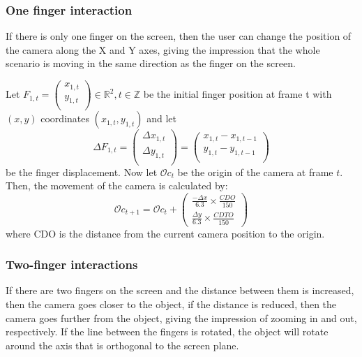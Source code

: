 \documentclass[12pt]{extarticle}
\newcommand{\R}{\mathbb{R}}
\newcommand{\Z}{\mathbb{Z}}
\begin{document}
\subsubsection* {One finger interaction}
If there is only one finger on the screen, then the user can change the position of the camera along the X and Y axes, giving the impression that the whole scenario is moving in the same direction as the finger on the screen.

Let $F_{1,t}=\begin{pmatrix} x_{1,t}\\y_{1,t}\\ \end{pmatrix} \in \R^2, t\in \Z$ be the initial finger position at frame t with $(x,y)$ coordinates $(x_{1,t},y_{1,t})$ and let $$\Delta F_{1,t}=\begin{pmatrix} \Delta x_{1,t}\\\Delta y_{1,t}\\ \end{pmatrix}=\begin{pmatrix} x_{1,t}-x_{1,t-1}\\y_{1,t}-y_{1,t-1}\\ \end{pmatrix}$$ be the finger displacement. Now let $\mathcal Oc_t$ be the origin of the camera at frame $t$. Then, the movement of the camera is calculated by:
$$\mathcal Oc_{t+1}=\mathcal Oc_t+\begin{pmatrix}\frac{-\Delta x }{6.3}\times\frac {CDO}{150}\\\frac{\Delta y }{6.3}\times\frac {CDTO}{150}\end{pmatrix}$$
where CDO is the distance from the current camera position to the origin.

\subsubsection* {Two-finger interactions}
If there are two fingers on the screen and the distance between them is increased, then the camera goes closer to the object, if the distance is reduced, then the camera goes further from the object, giving the impression of zooming in and out, respectively. If the line between the fingers is rotated, the object will rotate around the axis that is orthogonal to the screen plane.
\end{document}
